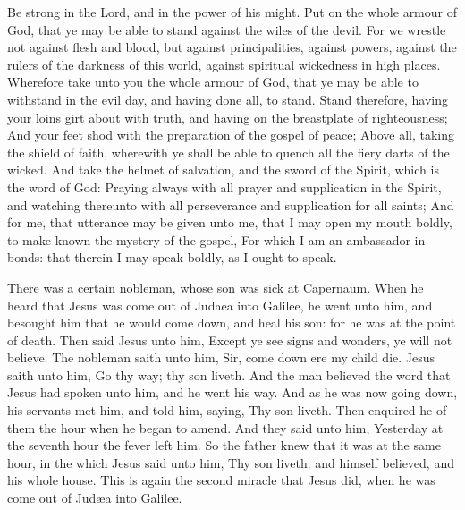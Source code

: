  Be strong in the Lord, and in the power of his might. Put on the whole armour of God, that ye may be able to stand against the wiles of the devil. For we wrestle not against flesh and blood, but against principalities, against powers, against the rulers of the darkness of this world, against spiritual wickedness in high places. Wherefore take unto you the whole armour of God, that ye may be able to withstand in the evil day, and having done all, to stand. Stand therefore, having your loins girt about with truth, and having on the breastplate of righteousness; And your feet shod with the preparation of the gospel of peace; Above all, taking the shield of faith, wherewith ye shall be able to quench all the fiery darts of the wicked. And take the helmet of salvation, and the sword of the Spirit, which is the word of God: Praying always with all prayer and supplication in the Spirit, and watching thereunto with all perseverance and supplication for all saints; And for me, that utterance may be given unto me, that I may open my mouth boldly, to make known the mystery of the gospel, For which I am an ambassador in bonds: that therein I may speak boldly, as I ought to speak.


 There was a certain nobleman, whose son was sick at Capernaum. When he heard that Jesus was come out of Judaea into Galilee, he went unto him, and besought him that he would come down, and heal his son: for he was at the point of death. Then said Jesus unto him, Except ye see signs and wonders, ye will not believe. The nobleman saith unto him, Sir, come down ere my child die. Jesus saith unto him, Go thy way; thy son liveth. And the man believed the word that Jesus had spoken unto him, and he went his way. And as he was now going down, his servants met him, and told him, saying, Thy son liveth. Then enquired he of them the hour when he began to amend. And they said unto him, Yesterday at the seventh hour the fever left him. So the father knew that it was at the same hour, in the which Jesus said unto him, Thy son liveth: and himself believed, and his whole house. This is again the second miracle that Jesus did, when he was come out of Jud{\ae}a into Galilee.

